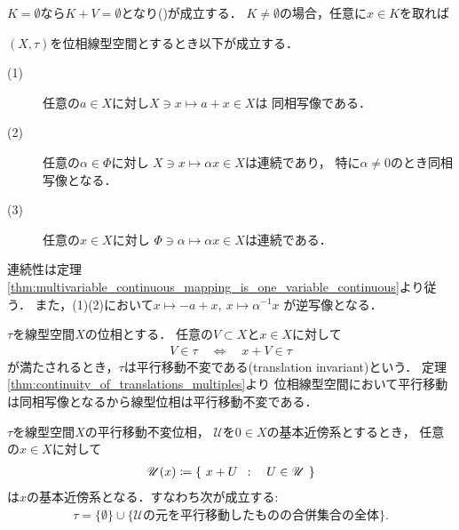 	\begin{prf}
		$K = \emptyset$なら$K + V = \emptyset$となり()が成立する．
		$K \neq \emptyset$の場合，任意に$x \in K$を取れば
	\end{prf}
	
	\begin{screen}
		\begin{thm}\label{thm:continuity_of_translations_multiples}
			$(X,\tau)$を位相線型空間とするとき以下が成立する．
			\begin{description}
				\item[(1)] 任意の$a \in X$に対し$X \ni x \longmapsto a + x \in X$は
					同相写像である．
					
				\item[(2)] 任意の$\alpha \in \Phi$に対し
					$X \ni x \longmapsto \alpha x \in X$は連続であり，
					特に$\alpha \neq 0$のとき同相写像となる．
					
				\item[(3)] 任意の$x \in X$に対し
					$\Phi \ni \alpha \longmapsto \alpha x \in X$は連続である．
			\end{description}
		\end{thm}
	\end{screen}
	
	\begin{prf}
		連続性は定理\ref{thm:multivariable_continuous_mapping_is_one_variable_continuous}より従う．
		また，(1)(2)において$x \longmapsto -a+x,\ x \longmapsto \alpha^{-1}x$
		が逆写像となる．
		\QED
	\end{prf}
	
	\begin{screen}
		\begin{thm}[平行移動不変位相]
			$\tau$を線型空間$X$の位相とする．
			任意の$V \subset X$と$x \in X$に対して
			\begin{align}
				V \in \tau \quad \Longleftrightarrow \quad
				x + V \in \tau
			\end{align}
			が満たされるとき，$\tau$は平行移動不変である(translation invariant)という．
			定理\ref{thm:continuity_of_translations_multiples}より
			位相線型空間において平行移動は同相写像となるから線型位相は平行移動不変である．
		\end{thm}
	\end{screen}
	
	\begin{screen}
		\begin{thm}
			$\tau$を線型空間$X$の平行移動不変位相，
			$\mathscr{U}$を$0 \in X$の基本近傍系とするとき，
			任意の$x \in X$に対して
			\begin{align}
				\mathscr{U}(x) \coloneqq
				\left\{\ x + U\ \, : \quad U \in \mathscr{U}\ \right\}
			\end{align}
			は$x$の基本近傍系となる．すなわち次が成立する:
			\begin{align}
				\tau = \{\emptyset\} \cup 
				\{\mbox{$\mathscr{U}$の元を平行移動したものの合併集合の全体}\}.
			\end{align}
		\end{thm}
	\end{screen}
	
